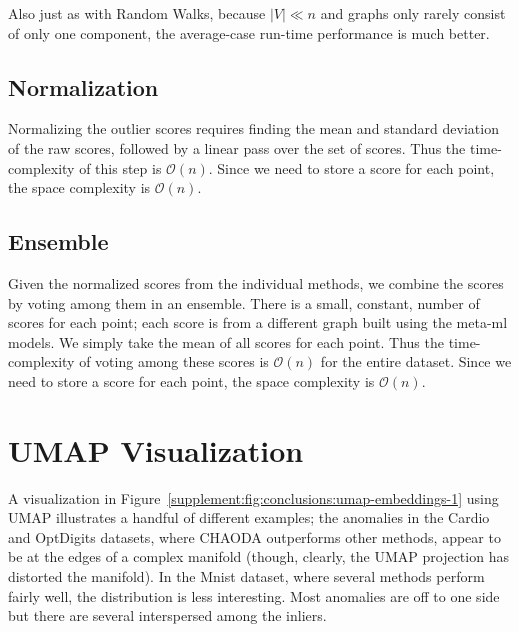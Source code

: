 Also just as with Random Walks, because $|V| \ll n$ and graphs only rarely consist of only one component, the average-case run-time performance is much better.

\subsection{Normalization}

Normalizing the outlier scores requires finding the mean and standard deviation of the raw scores, followed by a linear pass over the set of scores.
Thus the time-complexity of this step is $\mathcal{O}(n)$.
Since we need to store a score for each point, the space complexity is $\mathcal{O}(n)$.

\subsection{Ensemble}

Given the normalized scores from the individual methods, we combine the scores by voting among them in an ensemble.
There is a small, constant, number of scores for each point; each score is from a different graph built using the meta-ml models.
We simply take the mean of all scores for each point.
Thus the time-complexity of voting among these scores is $\mathcal{O}(n)$ for the entire dataset.
Since we need to store a score for each point, the space complexity is $\mathcal{O}(n)$.


\section{UMAP Visualization}
\label{supplement:sec:umap-visualization}

A visualization in Figure~\ref{supplement:fig:conclusions:umap-embeddings-1} using UMAP illustrates a handful of different examples;
the anomalies in the Cardio and OptDigits datasets, where CHAODA outperforms other methods, appear to be at the edges of a complex manifold (though, clearly, the UMAP projection has distorted the manifold).
In the Mnist dataset, where several methods perform fairly well, the distribution is less interesting.
Most anomalies are off to one side but there are several interspersed among the inliers.

